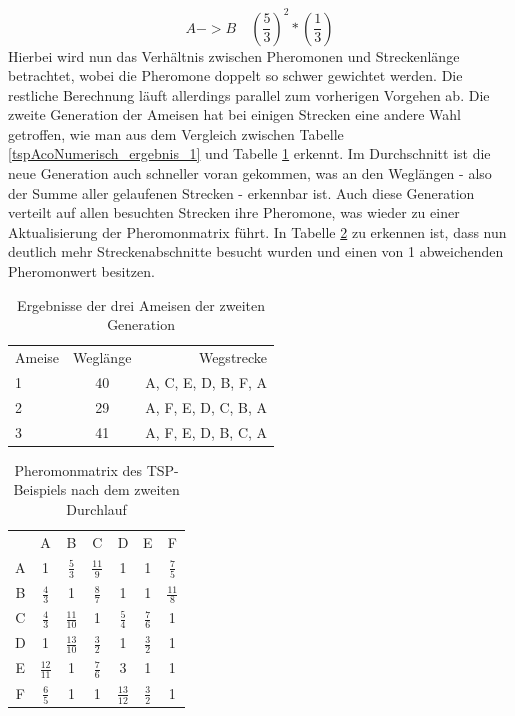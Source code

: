 	\begin{equation}
		A -> B \quad (\frac{5}{3})^2 * (\frac{1}{3})
	\end{equation}
	Hierbei wird nun das Verhältnis zwischen Pheromonen und Streckenlänge betrachtet, wobei die Pheromone doppelt so schwer gewichtet werden. Die restliche Berechnung läuft allerdings parallel zum vorherigen Vorgehen ab. Die zweite Generation der Ameisen hat bei einigen Strecken eine andere Wahl getroffen, wie man aus dem Vergleich zwischen Tabelle \ref{tspAcoNumerisch_ergebnis_1} und Tabelle \ref{tspAcoNumerisch_ergebnis_2} erkennt. Im Durchschnitt ist die neue Generation auch schneller voran gekommen, was an den Weglängen - also der Summe aller gelaufenen Strecken - erkennbar ist.
	\newpage
	Auch diese Generation verteilt auf allen besuchten Strecken ihre Pheromone, was wieder zu einer Aktualisierung der Pheromonmatrix führt. In Tabelle \ref{tspAcoNumerisch_pheromon_2} zu erkennen ist, dass nun deutlich mehr Streckenabschnitte besucht wurden und einen von 1 abweichenden Pheromonwert besitzen.
	\begin{table}[H]
		\centering
		\footnotesize
		\begin{tabular}{l c r}
			Ameise & Weglänge & Wegstrecke \\
			1 & 40 & A, C, E, D, B, F, A\\
			2 & 29 & A, F, E, D, C, B, A\\ 
			3 & 41 & A, F, E, D, B, C, A\\
		\end{tabular}
		\caption{Ergebnisse der drei Ameisen der zweiten Generation}
		\label{tspAcoNumerisch_ergebnis_2}
	\end{table}
	\begin{table}[H]
		\centering
		\footnotesize
		\begin{tabular}{c c c c c c c}
			& A & B & C & D & E & F \\
			A & 1 & $\frac{5}{3}$ & $\frac{11}{9}$ & 1 & 1 & $\frac{7}{5}$\\ 
			B & $\frac{4}{3}$ & 1 & $\frac{8}{7}$ & 1 & 1 & $\frac{11}{8}$\\ 
			C & $\frac{4}{3}$ & $\frac{11}{10}$ & 1 & $\frac{5}{4}$ & $\frac{7}{6}$ & 1\\
			D & 1 & $\frac{13}{10}$ & $\frac{3}{2}$ & 1 & $\frac{3}{2}$ & 1\\
			E & $\frac{12}{11}$ & 1 & $\frac{7}{6}$ & 3 & 1 & 1\\
			F & $\frac{6}{5}$ & 1 & 1 & $\frac{13}{12}$ & $\frac{3}{2}$ & 1\\
		\end{tabular}
		\caption{Pheromonmatrix des \ac{TSP}-Beispiels nach dem zweiten Durchlauf}
		\label{tspAcoNumerisch_pheromon_2}
	\end{table}
